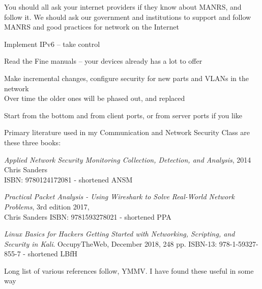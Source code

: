 \documentclass[Screen16to9,17pt]{foils}
\begin{document}
You should all ask your internet providers if they know about MANRS, and follow it. We should ask our government and institutions to support and follow MANRS and good practices for network on the Internet





\begin{list2}
\item Implement IPv6 -- take control
\item Read the Fine manuals -- your devices already has a lot to offer
\item Make incremental changes, configure security for new parts and VLANs in the network\\
Over time the older ones will be phased out, and replaced
\item Start from the bottom and from client ports, or from server ports if you like
\end{list2}

\myquestionspage


Primary literature used in my Communication and Network Security Class
are these three books:
\begin{list2}
\item \emph{Applied Network Security Monitoring Collection, Detection, and Analysis}, 2014 Chris Sanders \\
ISBN: 9780124172081 - shortened ANSM
\item \emph{Practical Packet Analysis - Using Wireshark to Solve Real-World Network Problems}, 3rd edition 2017, \\
Chris Sanders ISBN: 9781593278021 - shortened PPA
\item \emph{Linux Basics for Hackers Getting Started with Networking, Scripting, and Security in Kali}. OccupyTheWeb, December 2018, 248 pp. ISBN-13: 978-1-59327-855-7 - shortened LBfH
\end{list2}

\label{resources}
Long list of various references follow, YMMV. I have found these useful in some way
\end{document}
